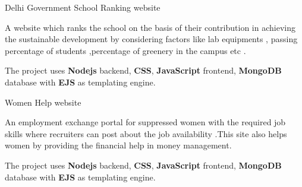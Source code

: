 
\begin{cventries}
  \cventry
    {} %
    {Delhi Government School Ranking website } %
    {} %
    {} %
    {
      \begin{cvitems} %
        \item {A website which ranks the school on the basis of their contribution in achieving the sustainable development by considering factors like lab equipments , passing percentage of students ,percentage of greenery in the campus etc .}
		\item {The project uses \textbf{Nodejs} backend, \textbf{CSS}, \textbf{JavaScript} frontend, \textbf{MongoDB} database with \textbf{EJS} as templating engine.}
      \end{cvitems}
    }

  \cventry
    {} %
    {Women Help website } %
    {} %
    {} %
    {
      \begin{cvitems} %
      	\item { An employment exchange portal for suppressed women with the required job skills where recruiters can post about the job availability .This site also helps women by providing the financial help in money management.}
		\item {The project uses \textbf{Nodejs} backend, \textbf{CSS}, \textbf{JavaScript} frontend, \textbf{MongoDB} database with \textbf{EJS} as templating engine.}
      \end{cvitems}
    }
    

\end{cventries}

